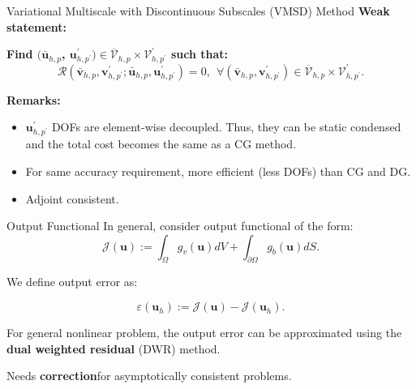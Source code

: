 \documentclass{beamer}
\newcounter{sectionframecount}
\begin{document}

\begin{frame}[t]{Variational Multiscale with Discontinuous Subscales (VMSD) Method}
  \textbf{Weak statement:}

  \vspace{10pt}
  \textbf{Find $(\bar{\boldsymbol{u}}_{h,p}$, $\boldsymbol{u}^\prime_{h,p^\prime}) \in \overline{\mathcal{V}}_{h,p} \times \mathcal{V}^\prime_{h,p^\prime}$ such that:}
  \begin{equation}
    \mathcal{R}(\bar{\boldsymbol{v}}_{h,p},\boldsymbol{v}^\prime_{h,p^\prime};\bar{\boldsymbol{u}}_{h,p},\boldsymbol{u}^\prime_{h,p^\prime}) = 0,~~\forall (\bar{\boldsymbol{v}}_{h,p},\boldsymbol{v}^\prime_{h,p^\prime}) \in \overline{\mathcal{V}}_{h,p} \times \mathcal{V}^\prime_{h,p^\prime}.
    \label{e:multiscale_weak_statement}
  \end{equation}

  \vspace{10pt}
  \textbf{Remarks:}
  \begin{itemize}
    \item $\boldsymbol{u}^\prime_{h,p^\prime}$ DOFs are element-wise decoupled. Thus, they can be static condensed and the total cost becomes the same as a CG method.
    \item For same accuracy requirement, more efficient (less DOFs) than CG and DG.
    \item Adjoint consistent.
  \end{itemize}
\end{frame}


\begin{frame}[t]{Output Functional}
  In general, consider output functional of the form:
  \begin{equation}
    \mathcal{J}(\boldsymbol{u}) := \int_{\Omega} g_v(\boldsymbol{u})dV + \int_{\partial \Omega} g_b(\boldsymbol{u})dS.
    \label{e:general_output_functional}
  \end{equation}

We define output error as:

\begin{equation}
  \varepsilon (\boldsymbol{u}_h) := \mathcal{J}(\boldsymbol{u}) - \mathcal{J}(\boldsymbol{u}_h).
\end{equation}

\vspace{8pt}
For general nonlinear problem, the output error can be approximated using the \textbf{dual weighted residual} (DWR) method.

\vspace{10pt}
Needs \textbf{correction}\footnotemark for asymptotically consistent problems.


\end{frame}
\end{document}
